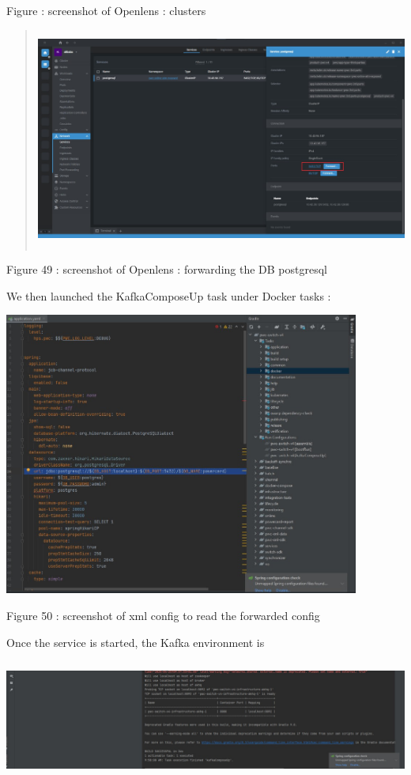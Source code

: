 \documentclass[12pt,a4paper]{report}
\begin{document}
\protect\hypertarget{_Toc201954524}{}{}Figure : screenshot of Openlens :
clusters

\begin{quote}
\includegraphics[width=5.2874in,height=2.86396in]{vertopal_d1b0b2209edd4c6aa8254f57daa0953b/media/image68.jpeg}
\end{quote}

\protect\hypertarget{_Toc201954525}{}{}Figure 49 : screenshot of
Openlens : forwarding the DB postgresql

We then launched the KafkaComposeUp task under Docker tasks :

\includegraphics[width=4.60331in,height=3.66847in]{vertopal_d1b0b2209edd4c6aa8254f57daa0953b/media/image69.jpeg}

\protect\hypertarget{_Toc201954526}{}{}Figure 50 : screenshot of xml
config to read the forwarded config

Once the service is started, the Kafka environment is

\includegraphics[width=6.29138in,height=1.53583in]{vertopal_d1b0b2209edd4c6aa8254f57daa0953b/media/image70.jpeg}
\end{document}
